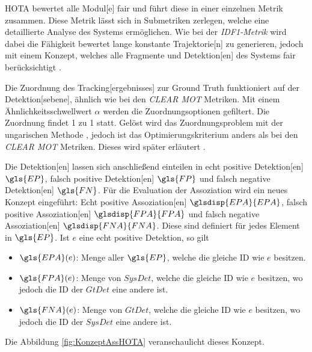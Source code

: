 \gls{HOTA} bewertet alle \gls{Modul}[e] fair und führt diese in einer einzelnen Metrik zusammen. Diese Metrik lässt sich in Submetriken zerlegen, welche eine detaillierte Analyse des Systems ermöglichen. Wie bei der \textit{\gls{IDF1}-Metrik} wird dabei die Fähigkeit bewertet lange konstante \gls{Trajektorie}[n] zu generieren, jedoch mit einem Konzept, welches alle Fragmente und \gls{Detektion}[en] des Systems fair berücksichtigt \cite{HOTA}. \par

Die Zuordnung des \gls{Tracking}[ergebnisses] zur \gls{Ground Truth} funktioniert auf der \gls{Detektion}[sebene], ähnlich wie bei den \textit{\acrshort{CLEAR} \gls{MOT}} Metriken. Mit einem Ähnlichkeitsschwellwert \(\alpha\) werden die Zuordnungsoptionen gefiltert. Die Zuordnung findet 1 zu 1 statt. Gelöst wird das Zuordnungsproblem mit der ungarischen Methode \cite{Kuhn.1955}, jedoch ist das Optimierungskriterium anders als bei den \textit{\acrshort{CLEAR} \gls{MOT}} Metriken. Dieses wird später erläutert \cite{HOTA}. \par

Die \gls{Detektion}[en] lassen sich anschließend einteilen in echt positive \gls{Detektion}[en] \(\gls{EP}\), falsch positive \gls{Detektion}[en] \(\gls{FP}\) und falsch negative \gls{Detektion}[en] \(\gls{FN}\). Für die Evaluation der \gls{Assoziation} wird ein neues Konzept eingeführt: Echt positive \gls{Assoziation}[en] \(\glsdisp{EPA}{EPA}\), falsch positive \gls{Assoziation}[en] \(\glsdisp{FPA}{FPA}\) und falsch negative \gls{Assoziation}[en] \(\glsdisp{FNA}{FNA}\). Diese sind definiert für jedes Element in \(\gls{EP}\). Ist \(e\) eine echt positive \gls{Detektion}, so gilt

\begin{itemize}
    \item \(\gls{EPA}(e)\): Menge aller \(\gls{EP}\), welche die gleiche \acrshort{ID} wie \(e\) besitzen.
    \item \(\gls{FPA}(e)\): Menge von \(SysDet\), welche die gleiche \acrshort{ID} wie \(e\) besitzen, wo jedoch die \acrshort{ID} der \(GtDet\) eine andere ist.
    \item \(\gls{FNA}(e)\): Menge von \(GtDet\), welche die gleiche \acrshort{ID} wie \(e\) besitzen, wo jedoch die \acrshort{ID} der \(SysDet\) eine andere ist.
\end{itemize}

Die Abbildung \ref{fig:KonzeptAssHOTA} veranschaulicht dieses Konzept.
    
